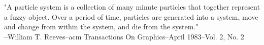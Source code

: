 "A particle system is a collection of many minute particles that together represent a fuzzy object. Over a period of time, particles are generated into a system, move and change from within the system, and die from the system."\\

--William T. Reeves--acm Transactions On Graphics--April 1983--Vol. 2, No. 2